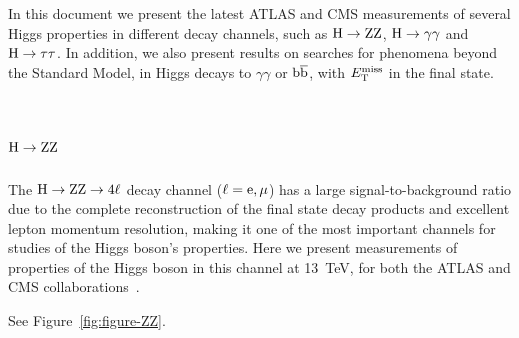 \documentclass[10pt]{article}
\begin{document}
In this document we present the latest ATLAS and CMS measurements of several
Higgs properties in different decay channels, such as ${\rm H\to ZZ}$,
${\rm H\to\gamma\gamma}$ and ${\rm H\to\tau\tau}$. In addition, we also present
results on searches for phenomena beyond the Standard Model, in Higgs decays
to $\gamma\gamma$ or ${\rm b\bar{b}}$, with $E_{\rm T}^{\rm miss}$ in the final
state.


\section{\boldmath ${\rm H}\to{\rm ZZ}$}

The ${\rm H\to ZZ\to 4\ell}$ decay channel (${\rm \ell = e,\mu}$) has a large
signal-to-background ratio due to the complete reconstruction of the final state
decay products and excellent lepton momentum resolution, making it one of the
most important channels for studies of the Higgs boson's properties. Here we
present measurements of properties of the Higgs boson in this channel at 13~TeV,
for both the ATLAS and CMS collaborations~\cite{ATLAS-ZZ,CMS:2017jkd}.

See Figure~\ref{fig:figure-ZZ}. 
\end{document}
